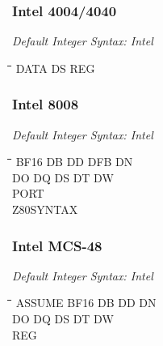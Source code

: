 \subsubsection{Intel 4004/4040}

{\em Default Integer Syntax: Intel}

{\tt\begin{tabbing}
\hspace{3cm}\=\hspace{3cm}\=\hspace{3cm}\=\hspace{3cm}\=\kill   
DATA       \> DS          \> REG \\
\end{tabbing}}

\subsubsection{Intel 8008}

{\em Default Integer Syntax: Intel}

{\tt\begin{tabbing}
\hspace{3cm}\=\hspace{3cm}\=\hspace{3cm}\=\hspace{3cm}\=\kill    
BF16       \> DB          \> DD          \> DFB         \> DN \\
DO         \> DQ          \> DS          \> DT          \> DW \\
PORT \\
Z80SYNTAX \\
\end{tabbing}}

\subsubsection{Intel MCS-48}

{\em Default Integer Syntax: Intel}

{\tt\begin{tabbing}
\hspace{3cm}\=\hspace{3cm}\=\hspace{3cm}\=\hspace{3cm}\=\kill
ASSUME     \> BF16       \> DB          \> DD          \> DN \\
DO         \> DQ         \> DS          \> DT          \> DW \\
REG \\
\end{tabbing}}

